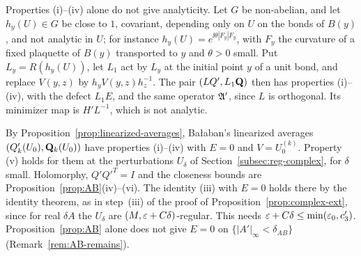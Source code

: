 \begin{remark}
Properties (i)--(iv) alone do not give analyticity. Let $G$ be non-abelian, and let $h_y(U)\in G$ be close to $1$, covariant, depending only on $U$ on the bonds of $B(y)$, and not analytic in $U$; for instance $h_y(U)=e^{\ii\theta|F_y|F_y}$, with $F_y$ the curvature of a fixed plaquette of $B(y)$ transported to $y$ and $\theta>0$ small. Put $L_y=R(h_y(U))$, let $L_1$ act by $L_y$ at the initial point $y$ of a unit bond, and replace $V(y,z)$ by $h_yV(y,z)h_z^{-1}$. The pair $(LQ',L_1\mathbf Q)$ then has properties (i)--(iv), with the defect $L_1E$, and the same operator $\mathfrak A'$, since $L$ is orthogonal. Its minimizer map is $H'L^{-1}$, which is not analytic.

By Proposition~\ref{prop:linearized-averages}, Ba\l aban's linearized averages $(Q'_k(U_0),\mathbf Q_k(U_0))$ have properties (i)--(iv) with $E=0$ and $V=U_0^{(k)}$. Property (v) holds for them at the perturbations $U_\delta$ of Section~\ref{subsec:reg-complex}, for $\delta$ small. Holomorphy, $Q'Q'^T=I$ and the closeness bounds are Proposition~\ref{prop:AB}(iv)--(vi). The identity (iii) with $E=0$ holds there by the identity theorem, as in step~(iii) of the proof of Proposition~\ref{prop:complex-ext}, since for real $\delta\!A$ the $U_\delta$ are $(M,\varepsilon+C\delta)$-regular. This needs $\varepsilon+C\delta\le\min(\varepsilon_0,c'_3)$. Proposition~\ref{prop:AB} alone does not give $E=0$ on $\{|A'|_\infty<\delta_{AB}\}$ (Remark~\ref{rem:AB-remains}).
\end{remark}
